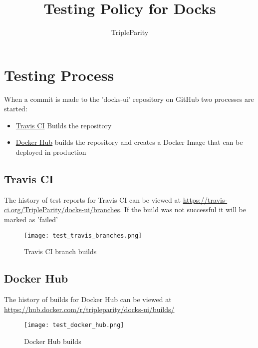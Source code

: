 \documentclass[]{article}
\title{Testing Policy for Docks}
\author{TripleParity}
\date{}
\begin{document}
	
\maketitle

\tableofcontents

\section{Testing Process}
When a commit is made to the 'docks-ui' repository on GitHub two
processes are started:
\begin{itemize}
	\item \href{https://travis-ci.org/TripleParity/docks-ui/branches}{Travis CI} Builds the repository
	\item \href{https://hub.docker.com/r/tripleparity/docks-ui/builds/}{Docker Hub} builds the repository and creates a Docker Image that can be deployed in production
\end{itemize}

\subsection{Travis CI}
The history of test reports for Travis CI can be viewed at \url{https://travis-ci.org/TripleParity/docks-ui/branches}.
If the build was not successful it will be marked as 'failed'

\begin{figure}[H]
	\centering
	\texttt{[image: test\_travis\_branches.png]}
	\caption{Travis CI branch builds}
\end{figure}

\subsection{Docker Hub}
The history of builds for Docker Hub can be viewed at
\url{https://hub.docker.com/r/tripleparity/docks-ui/builds/}

\begin{figure}[h!]
	\centering
	\texttt{[image: test\_docker\_hub.png]}
	\caption{Docker Hub builds}
\end{figure}
\end{document}
